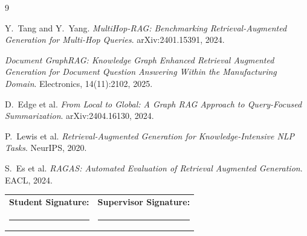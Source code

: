 \documentclass[10pt,a4paper]{article}
\begin{document}
\begingroup
\renewcommand{\refname}{\texorpdfstring{\color{mainblue}}{}Preliminary References}
\scriptsize
\begin{thebibliography}{9}
\setlength{\itemsep}{0pt}

Y.\ Tang and Y.\ Yang.
\textit{MultiHop-RAG: Benchmarking Retrieval-Augmented Generation for Multi-Hop Queries}.
arXiv:2401.15391, 2024.

\textit{Document GraphRAG: Knowledge Graph Enhanced Retrieval Augmented Generation for Document Question Answering Within the Manufacturing Domain}.
Electronics, 14(11):2102, 2025.

D.\ Edge et al.
\textit{From Local to Global: A Graph RAG Approach to Query-Focused Summarization}.
arXiv:2404.16130, 2024.

P.\ Lewis et al.
\textit{Retrieval-Augmented Generation for Knowledge-Intensive NLP Tasks}.
NeurIPS, 2020.

S.\ Es et al.
\textit{RAGAS: Automated Evaluation of Retrieval Augmented Generation}.
EACL, 2024.

\end{thebibliography}
\endgroup

\vspace{0.1em}

\noindent
\begin{tabularx}{\textwidth}{X X}
\textbf{Student Signature:} & \textbf{Supervisor Signature:} \\[0.9em]
\rule{0.42\textwidth}{0.4pt} & \rule{0.42\textwidth}{0.4pt} \\
\end{tabularx}
\end{document}
